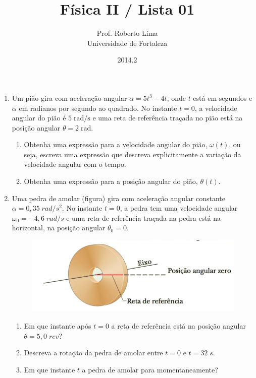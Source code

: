 \documentclass[brazil]{article}
\title{Física II / Lista 01}
\date{2014.2}
\author{Prof. Roberto Lima \\Universidade de Fortaleza}
\begin{document}
\maketitle

\begin{enumerate}

\item Um pião gira com aceleração angular $\alpha = 5t^3 - 4t$, onde $t$ está em segundos e $\alpha$ em radianos por segundo ao quadrado. No instante $t=0$, a velocidade angular do pião é $5\;\mbox{rad/s}$ e uma reta de referência traçada no pião está na posição angular $\theta=2\;\mbox{rad}$.
\begin{enumerate}
\item Obtenha uma expressão para a velocidade angular do pião, $\omega(t)$, ou seja, escreva uma expressão que descreva explicitamente a variação da velocidade angular com o tempo.
\item Obtenha uma expressão para a posição angular do pião, $\theta(t)$.
\end{enumerate}


\item Uma pedra de amolar (figura) gira com aceleração angular constante $\alpha=0,35\; rad/s^2$. No instante $t=0$, a pedra tem uma velocidade angular $\omega_0 = - 4,6\; rad/s$ e uma reta de referência traçada na pedra está na horizontal, na posição angular $\theta_0 = 0$.
\begin{figure}[H]
\includegraphics[scale=0.4]{figs/pedra-amolar.png}
\end{figure}
\begin{enumerate}
\item Em que instante após $t=0$ a reta de referência está na posição angular $\theta=5,0\;rev$?
\item Descreva a rotação da pedra de amolar entre $t=0$ e $t=32\;s$.
\item Em que instante $t$ a pedra de amolar para momentaneamente?
\end{enumerate}



\end{enumerate}
\end{document}
